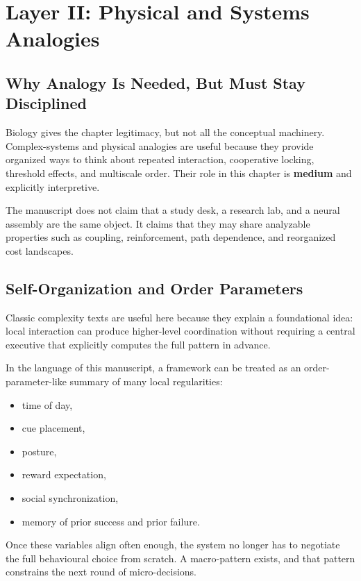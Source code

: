 \section{Layer II: Physical and Systems Analogies}

\subsection{Why Analogy Is Needed, But Must Stay Disciplined}

Biology gives the chapter legitimacy, but not all the conceptual machinery.
Complex-systems and physical analogies are useful because they provide
organized ways to think about repeated interaction, cooperative locking,
threshold effects, and multiscale order. Their role in this chapter is
\textbf{medium} and explicitly interpretive.

\begin{remark}
The manuscript does not claim that a study desk, a research lab, and a neural
assembly are the same object. It claims that they may share analyzable
properties such as coupling, reinforcement, path dependence, and reorganized
cost landscapes.
\end{remark}

\subsection{Self-Organization and Order Parameters}

Classic complexity texts are useful here because they explain a foundational
idea: local interaction can produce higher-level coordination without requiring
a central executive that explicitly computes the full pattern in advance.

In the language of this manuscript, a framework can be treated as an
order-parameter-like summary of many local regularities:
\begin{itemize}[nosep]
  \item time of day,
  \item cue placement,
  \item posture,
  \item reward expectation,
  \item social synchronization,
  \item memory of prior success and prior failure.
\end{itemize}

Once these variables align often enough, the system no longer has to negotiate
the full behavioural choice from scratch. A macro-pattern exists, and that
pattern constrains the next round of micro-decisions.

